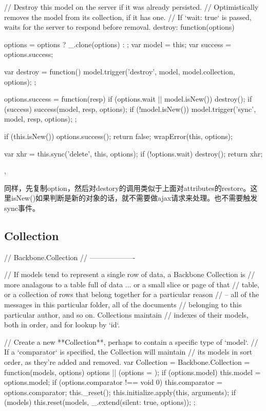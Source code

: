 \begin{JavaScript}
    // Destroy this model on the server if it was already persisted.
    // Optimistically removes the model from its collection, if it has one.
    // If `wait: true` is passed, waits for the server to respond before removal.
    destroy: function(options) {
      options = options ? _.clone(options) : {};
      var model = this;
      var success = options.success;

      var destroy = function() {
        model.trigger('destroy', model, model.collection, options);
      };

      options.success = function(resp) {
        if (options.wait || model.isNew()) destroy();
        if (success) success(model, resp, options);
        if (!model.isNew()) model.trigger('sync', model, resp, options);
      };

      if (this.isNew()) {
        options.success();
        return false;
      }
      wrapError(this, options);

      var xhr = this.sync('delete', this, options);
      if (!options.wait) destroy();
      return xhr;
    },
\end{JavaScript}

同样，先复制option，然后对destory的调用类似于上面对attributes的restore。这里isNew()如果判断是新的对象的话，就不需要做ajax请求来处理。也不需要触发sync事件。


\subsection{Collection}

\begin{JavaScript}
  // Backbone.Collection
  // -------------------

  // If models tend to represent a single row of data, a Backbone Collection is
  // more analagous to a table full of data ... or a small slice or page of that
  // table, or a collection of rows that belong together for a particular reason
  // -- all of the messages in this particular folder, all of the documents
  // belonging to this particular author, and so on. Collections maintain
  // indexes of their models, both in order, and for lookup by `id`.

  // Create a new **Collection**, perhaps to contain a specific type of `model`.
  // If a `comparator` is specified, the Collection will maintain
  // its models in sort order, as they're added and removed.
  var Collection = Backbone.Collection = function(models, options) {
    options || (options = {});
    if (options.model) this.model = options.model;
    if (options.comparator !== void 0) this.comparator = options.comparator;
    this._reset();
    this.initialize.apply(this, arguments);
    if (models) this.reset(models, _.extend({silent: true}, options));
  };

\end{JavaScript}

